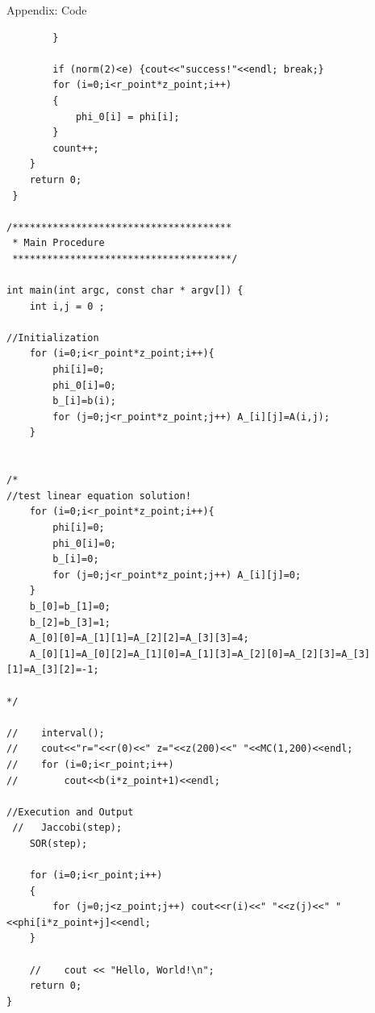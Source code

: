 \documentclass[letterpaper,12pt]{article}
\begin{document}
\begin{section}{Appendix: Code}
\begin{lstlisting}
        }

        if (norm(2)<e) {cout<<"success!"<<endl; break;}
        for (i=0;i<r_point*z_point;i++)
        {
            phi_0[i] = phi[i];
        }
        count++;
    }
    return 0;
 }

/**************************************
 * Main Procedure
 **************************************/

int main(int argc, const char * argv[]) {
    int i,j = 0 ;

//Initialization
    for (i=0;i<r_point*z_point;i++){
        phi[i]=0;
        phi_0[i]=0;
        b_[i]=b(i);
        for (j=0;j<r_point*z_point;j++) A_[i][j]=A(i,j);
    }
 

/*
//test linear equation solution!
    for (i=0;i<r_point*z_point;i++){
        phi[i]=0;
        phi_0[i]=0;
        b_[i]=0;
        for (j=0;j<r_point*z_point;j++) A_[i][j]=0;
    }
    b_[0]=b_[1]=0;
    b_[2]=b_[3]=1;
    A_[0][0]=A_[1][1]=A_[2][2]=A_[3][3]=4;
    A_[0][1]=A_[0][2]=A_[1][0]=A_[1][3]=A_[2][0]=A_[2][3]=A_[3][1]=A_[3][2]=-1;

*/

//    interval();
//    cout<<"r="<<r(0)<<" z="<<z(200)<<" "<<MC(1,200)<<endl;
//    for (i=0;i<r_point;i++)
//        cout<<b(i*z_point+1)<<endl;
    
//Execution and Output
 //   Jaccobi(step);
    SOR(step);

    for (i=0;i<r_point;i++) 
    {
        for (j=0;j<z_point;j++) cout<<r(i)<<" "<<z(j)<<" "<<phi[i*z_point+j]<<endl;
    }

    //    cout << "Hello, World!\n";
    return 0;
}

    \end{lstlisting}
  \end{section}

%
%
\end{document}

